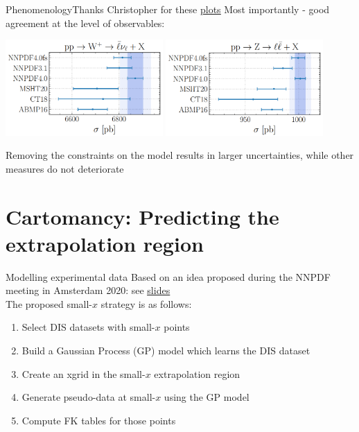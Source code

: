 \documentclass[aspectratio=169,11pt]{beamer}
\newcommand{\nn}{\vspace*{1em}}
\begin{document}
\begin{frame}[t]{Phenomenology}{Thanks Christopher for these {\color{blue} \underline{\href{https://vp.nnpdf.science/de96i8VBQ9Gc-zxl75AMfw==/pheno_featurescaling.pdf}{plots}}}}
  Most importantly - good agreement at the level of observables:
  \begin{center}
    \includegraphics[width=0.45\textwidth]{figures/pheno_w.png} \hfill
    \includegraphics[width=0.45\textwidth]{figures/pheno_z.png}
  \end{center}
  Removing the constraints on the model results in larger uncertainties, while other measures do not deteriorate
\end{frame}



\section{Cartomancy: Predicting the extrapolation region}


\begin{frame}[t]{Modelling experimental data}
  Based on an idea proposed during the NNPDF meeting in Amsterdam 2020: see 
  {\color{blue} \underline{\href{https://www.wiki.ed.ac.uk/download/attachments/432523942/carrazza.pdf?version=1&modificationDate=1581344104000&api=v2}{slides}}} \\ \nn
  The proposed small-$x$ strategy is as follows:
  \begin{enumerate}
    \item Select DIS datasets with small-$x$ points
    \item Build a Gaussian Process (GP) model which learns the DIS dataset
    \item Create an xgrid in the small-$x$ extrapolation region
    \item Generate pseudo-data at small-$x$ using the GP model
    \item Compute FK tables for those points
  \end{enumerate} 
\end{frame}
\end{document}
